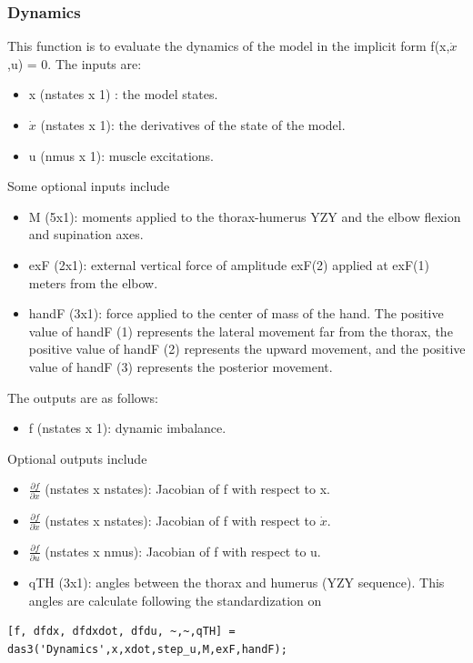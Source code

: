 \subsubsection{Dynamics} \label{sec:dynamics}
This function is to evaluate the dynamics of the model in the implicit form f(x,$\dot{x}$,u) = 0.
The inputs are:
\begin{itemize}
    \item x (nstates x 1) : the model states.
    \item $\dot{x}$ (nstates x 1): the derivatives of the state of the model.
    \item u (nmus x 1): muscle excitations.
\end{itemize}

Some optional inputs include
\begin{itemize}
    \item M (5x1): moments applied to the thorax-humerus YZY and the elbow flexion and supination axes.
    \item exF (2x1): external vertical force of amplitude exF(2) applied at exF(1) meters from the elbow.
    \item handF (3x1): force applied to the center of mass of the hand. The positive value of handF (1) represents the lateral movement far from the thorax, the positive value of handF (2) represents the upward movement, and the positive value of handF (3) represents the posterior movement.
\end{itemize}


The outputs are as follows:

\begin{itemize}
    \item f (nstates x 1): dynamic imbalance.
\end{itemize}

Optional outputs include
\begin{itemize}
    \item $\frac{\partial f}{\partial x}$ (nstates x nstates): Jacobian of f with respect to x.
    \item $\frac{\partial f}{\partial \dot{x}}$ (nstates x nstates): Jacobian of f with respect to $\dot{x}$.
    \item $\frac{\partial f}{\partial u}$ (nstates x nmus): Jacobian of f with respect to u.
    \item qTH (3x1): angles between the thorax and humerus (YZY sequence). This angles are calculate following the standardization on \cite{ISB}
\end{itemize}
\begin{lstlisting}[style=Matlab-editor]
[f, dfdx, dfdxdot, dfdu, ~,~,qTH] = das3('Dynamics',x,xdot,step_u,M,exF,handF);
\end{lstlisting}

